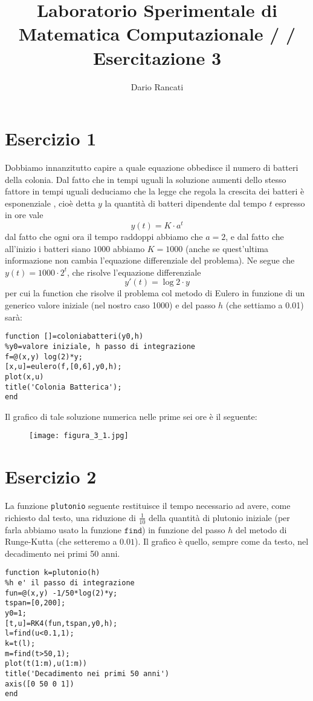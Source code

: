 \documentclass{article}
\title{\textbf{Laboratorio Sperimentale di Matematica Computazionale / / Esercitazione 3}}
\author{Dario Rancati}
\begin{document}
\section*{Esercizio 1}
Dobbiamo innanzitutto capire a quale equazione obbedisce il numero di batteri della colonia. Dal fatto che in tempi uguali la soluzione aumenti dello stesso fattore in tempi uguali deduciamo che la legge che regola la crescita dei batteri è esponenziale , cioè detta $y$ la quantità di batteri dipendente dal tempo $t$ espresso in ore vale
$$y(t)=K \cdot a^{t}$$
dal fatto che ogni ora il tempo raddoppi abbiamo che $a=2$, e dal fatto che all'inizio i batteri siano $1000$ abbiamo $K=1000$ (anche se quest'ultima informazione non cambia l'equazione differenziale del problema). Ne segue che $y(t) = 1000 \cdot 2^t$, che risolve l'equazione differenziale
$$y'(t)=\log{2}\cdot y$$
per cui la function che risolve il problema col metodo di Eulero in funzione di un generico valore iniziale (nel nostro caso 1000) e del passo $h$ (che settiamo a 0.01) sarà:
\begin{lstlisting}
function []=coloniabatteri(y0,h)
%y0=valore iniziale, h passo di integrazione
f=@(x,y) log(2)*y;
[x,u]=eulero(f,[0,6],y0,h);
plot(x,u)
title('Colonia Batterica');
end
\end{lstlisting}

\noindent
Il grafico di tale soluzione numerica nelle prime sei ore è il seguente:

\begin{figure}[!h]
\centering
\texttt{[image: figura\_3\_1.jpg]}
\end{figure}

\newpage

\section*{Esercizio 2}

La funzione \texttt{plutonio} seguente restituisce il tempo necessario ad avere, come richiesto dal testo, una riduzione di $\frac{1}{10}$ della quantità di plutonio iniziale (per farla abbiamo usato la funzione $\texttt{find}$) in funzione del passo $h$ del metodo di Runge-Kutta (che setteremo a $0.01$). Il grafico è quello, sempre come da testo, nel decadimento nei primi 50 anni.

\begin{lstlisting}
function k=plutonio(h)
%h e' il passo di integrazione
fun=@(x,y) -1/50*log(2)*y;
tspan=[0,200];
y0=1;
[t,u]=RK4(fun,tspan,y0,h);
l=find(u<0.1,1);
k=t(l);
m=find(t>50,1);
plot(t(1:m),u(1:m))
title('Decadimento nei primi 50 anni')
axis([0 50 0 1])
end
\end{lstlisting}
\end{document}
